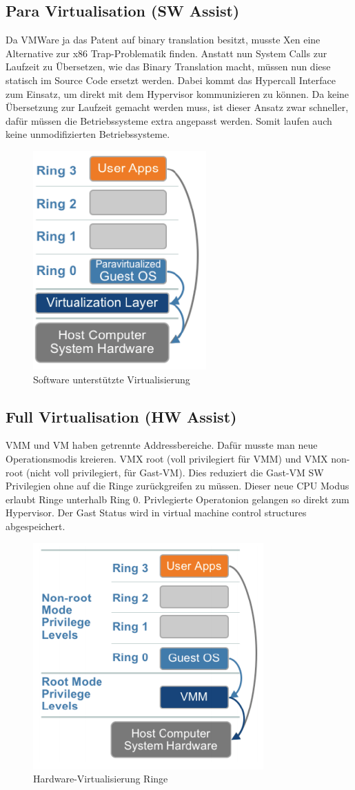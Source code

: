 \subsection{Para Virtualisation (SW Assist)}
Da VMWare ja das Patent auf binary translation besitzt, musste Xen eine Alternative zur x86 Trap-Problematik finden. Anstatt nun System Calls zur Laufzeit zu Übersetzen, wie das Binary Translation macht, müssen nun diese statisch im Source Code ersetzt werden. Dabei kommt das Hypercall Interface zum Einsatz, um direkt mit dem Hypervisor kommunizieren zu können. Da keine Übersetzung zur Laufzeit gemacht werden muss, ist dieser Ansatz zwar schneller, dafür müssen die Betriebssysteme extra angepasst werden. Somit laufen auch keine unmodifizierten Betriebssysteme.
\begin{figure}[h!]
\centering
\includegraphics[width=0.4\linewidth]{fig/sw-virtualisierung-ringe}
\caption{Software unterstützte Virtualisierung}
\label{fig:sw-virtualisierung-ringe}
\end{figure}

\subsection{Full Virtualisation (HW Assist)}
\label{sec:hw-unterstuetzt-virt}
VMM und VM haben getrennte Addressbereiche. Dafür musste man neue Operationsmodis kreieren. VMX root (voll privilegiert für VMM) und VMX non-root (nicht voll privilegiert, für Gast-VM). Dies reduziert die Gast-VM SW Privilegien ohne auf die Ringe zurückgreifen zu müssen. Dieser neue CPU Modus erlaubt Ringe unterhalb Ring 0. Privlegierte Operatonion gelangen so direkt zum Hypervisor. Der Gast Status wird in virtual machine control structures abgespeichert.
\begin{figure}[h!]
\centering
\includegraphics[width=0.4\linewidth]{fig/hw-virtualisierung-ringe}
\caption{Hardware-Virtualisierung Ringe}
\label{fig:hw-virtualisierung-ringe}
\end{figure}

